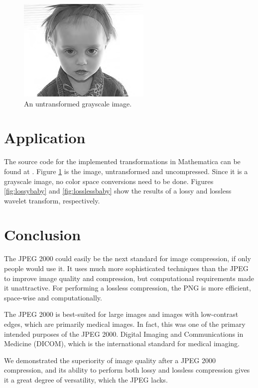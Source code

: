 \documentclass[titlepage,12pt]{article}
\begin{document}

\begin{figure}
	\centering
	\includegraphics{resources/baby.png}
	\caption{An untransformed grayscale image.}
	\label{fig:original}
\end{figure}


\section{Application}

The source code for the implemented transformations in Mathematica can be found at \cite{implement}.
Figure \ref{fig:original} is the image, untransformed and uncompressed.
Since it is a grayscale image, no color space conversions need to be done.
Figures \ref{fig:lossybaby} and \ref{fig:losslessbaby} show the results of a lossy and lossless 
wavelet transform, respectively.


\section{Conclusion}

The JPEG 2000 could easily be the next standard for image compression, if only people would use it.
It uses much more sophisticated techniques than the JPEG to improve image quality and compression,
but computational requirements made it unattractive.
For performing a lossless compression, the PNG is more efficient, space-wise and computationally.

The JPEG 2000 is best-suited for large images and images with low-contrast edges,
which are primarily medical images.
In fact, this was one of the primary intended purposes of the JPEG 2000.
Digital Imaging and Communications in Medicine (DICOM), 
which is the international standard for medical imaging.\cite{dicom}

We demonstrated the superiority of image quality after a JPEG 2000 compression, 
and its ability to perform both lossy and lossless compression gives it a 
great degree of versatility, which the JPEG lacks.


\printbibliography[]
\end{document}
